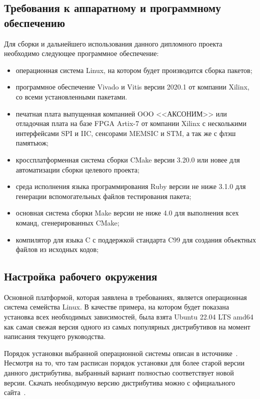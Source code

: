 \subsection{Требования к аппаратному и программному обеспечению}

Для сборки и дальнейшего использования данного дипломного проекта необходимо
следующее программное обеспечение:
\begin{itemize}
    \item операционная система Linux, на котором будет производится сборка пакетов;
    \item программное обеспечение Vivado и Vitis версии 2020.1 от компании Xilinx, со всеми установленными пакетами.
    \item печатная плата выпущенная компанией OOO <<АКСОНИМ>> или отладочная плата  на базе FPGA Artix-7 от компании Xilinx с несколькими интерфейсами SPI и IIC, 
    сенсорами MEMSIC и STM, а так же с флэш памятьюж;
    \item кроссплатформенная система сборки CMake версии 3.20.0 или новее
    для автоматизации сборки целевого проекта;
    \item среда исполнения языка программирования Ruby версии не ниже 3.1.0
    для генерации вспомогательных файлов тестирования пакета;
    \item основная система сборки Make версии не ниже 4.0 для выполнения всех команд,
    сгенерированных CMake;
    \item компилятор для языка C с поддержкой стандарта C99 для создания объектных
    файлов из исходных кодов;
\end{itemize}


\subsection{Настройка рабочего окружения}

Основной платформой, которая заявлена в требованиях,
является операционная система семейства Linux.
В качестве примера, на котором будет показана установка всех необходимых
зависимостей, была взята Ubuntu 22.04 LTS amd64 как самая свежая версия одного из самых популярных дистрибутивов на момент написания текущего руководства.


Порядок установки выбранной операционной системы описан в
источнике~\cite{ubuntu_how_to_install}. Несмотря на то, что там расписан порядок
установки для более старой версии данного дистрибутива, выбранный вариант
полностью соответствует новой версии.
Скачать необходимую версию дистрибутива можно с официального
сайта~\cite{ubuntu_download_site}.

